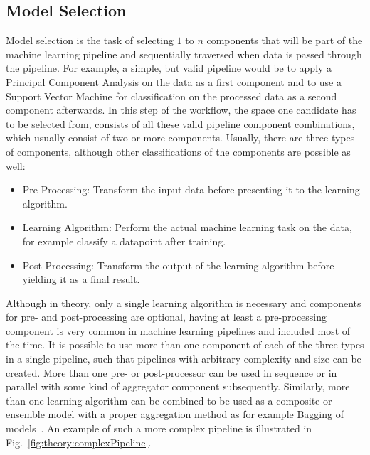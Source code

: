 \subsection{Model Selection}
\label{sec:theory:automl:selection}
Model selection is the task of selecting $1$ to $n$ components that will be part of the machine learning pipeline and sequentially traversed when data is passed through the pipeline.
For example, a simple, but valid pipeline would be to apply a Principal Component Analysis on the data as a first component and to use a Support Vector Machine for classification on the processed data as a second component afterwards.
In this step of the workflow, the space one candidate has to be selected from, consists of all these valid pipeline component combinations, which usually consist of two or more components.\newline
Usually, there are three types of components, although other classifications of the components are possible as well:
\begin{itemize}
    \item Pre-Processing: Transform the input data before presenting it to the learning algorithm.
    \item Learning Algorithm: Perform the actual machine learning task on the data, for example classify a datapoint after training.
    \item Post-Processing: Transform the output of the learning algorithm before yielding it as a final result.
\end{itemize}
Although in theory, only a single learning algorithm is necessary and components for pre- and post-processing are optional, having at least a pre-processing component is very common in machine learning pipelines and included most of the time.\newline
It is possible to use more than one component of each of the three types in a single pipeline, such that pipelines with arbitrary complexity and size can be created.
More than one pre- or post-processor can be used in sequence or in parallel with some kind of aggregator component subsequently.
Similarly, more than one learning algorithm can be combined to be used as a composite or ensemble model with a proper aggregation method as for example Bagging of models~\cite{Breiman-BaggingPredictors}.
An example of such a more complex pipeline is illustrated in Fig.~\ref{fig:theory:complexPipeline}.
